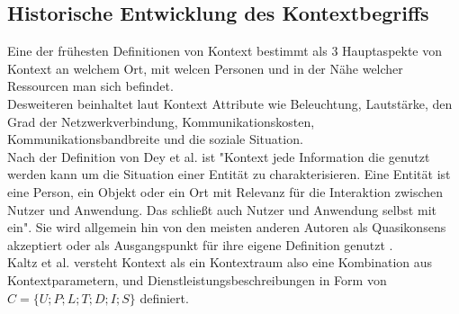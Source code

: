 \subsection{Historische Entwicklung des Kontextbegriffs}


Eine der frühesten Definitionen von Kontext \cite{schilit_context-aware_1994} bestimmt als 3 Hauptaspekte von Kontext an welchem Ort, mit welcen Personen und in der Nähe welcher Ressourcen man sich befindet.\\
Desweiteren beinhaltet laut  \cite{schilit_context-aware_1994} Kontext Attribute wie Beleuchtung, Lautstärke, den Grad der Netzwerkverbindung, Kommunikationskosten, Kommunikationsbandbreite und die soziale Situation.\\
Nach der Definition von Dey et al. \cite{dey_understanding_2001} ist "Kontext jede Information die genutzt werden kann um die Situation einer Entität zu charakterisieren. Eine Entität ist eine Person, ein Objekt oder ein Ort mit Relevanz für die Interaktion zwischen Nutzer und Anwendung. Das schließt auch Nutzer und Anwendung selbst mit ein".
Sie wird allgemein hin von den meisten anderen Autoren als Quasikonsens akzeptiert \cite{wei_liu_survey_2011,alegre_engineering_2016,aguilar_cameonto_2018} oder als Ausgangspunkt für ihre eigene Definition genutzt \cite{kokinov_operational_2007,kayes_icaf_2012}.\\
Kaltz et al. \cite{wolfgang_kaltz_context-aware_2005} versteht Kontext als ein Kontextraum also eine Kombination aus Kontextparametern, %
 und Dienstleistungsbeschreibungen in Form von $C = \{U;P;L;T;D;I;S\}$ definiert.
